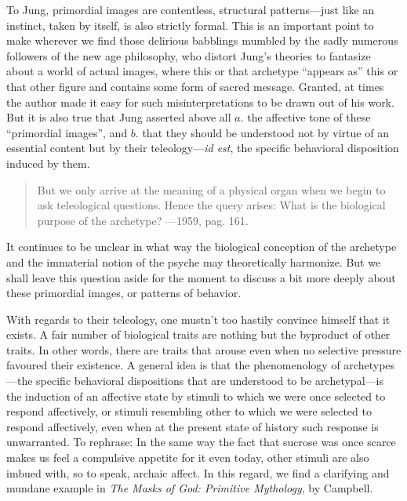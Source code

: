 \documentclass[a4paper]{article}
\begin{document}
    To Jung, primordial images are contentless, structural patterns—just like an
    instinct, taken by itself, is also strictly formal. This is an important
    point to make wherever we find those delirious babblings mumbled by the
    sadly numerous followers of the new age philosophy, who distort Jung's
    theories to fantasize about a world of actual images, where this or that
    archetype “appears as” this or that other figure and contains some form of
    sacred message. Granted, at times the author made it easy for such
    misinterpretations to be drawn out of his work. But it is also true that
    Jung asserted above all $a.$ the affective tone of these “primordial images”,
    and $b.$ that they should be understood not by virtue of an essential content
    but by their teleology—\textit{id est}, the specific behavioral disposition induced
    by them. 

    \begin{quote}
    But we only arrive at the meaning of a physical organ when we begin to ask
    teleological questions. Hence the query arises: What is the biological
    purpose of the archetype? —1959, pag. 161. 
    \end{quote}


    It continues to be unclear in what way the biological conception
    of the archetype and the immaterial notion of the psyche may theoretically
    harmonize. But we shall leave this question aside for the moment to discuss
    a bit more deeply about these primordial images, or patterns of behavior.

    With regards to their teleology, one mustn't too hastily convince himself
    that it exists. A fair number of biological traits are nothing but the
    byproduct of other traits. In other words, there are traits that arouse
    even when no selective pressure favoured their existence. A general idea is
    that the phenomenology of archetypes---the specific behavioral dispositions
    that are understood to be archetypal---is the induction of an affective
    state by stimuli to which we were once selected to respond affectively, or
    stimuli resembling other to which we were selected to respond affectively,
    even when at the present state of history such response is unwarranted.
    To rephrase: In the same way the fact that sucrose was once scarce makes us feel a
    compulsive appetite for it even today, other stimuli are also imbued with,
    so to speak, archaic affect. In this regard, we find a clarifying and
    mundane example in \textit{The Masks of God: Primitive Mythology}, by
    Campbell. 
\end{document}
